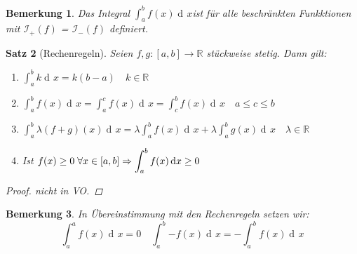 \documentclass[a4paper,titlepage,oneside]{article}
\def\R{\ensuremath{\mathbb{R}} }
\newcommand{\der}{\operatorname{d\!}{}}
\def\sp{\hspace{0,1cm}}
\newcommand{\integral}[4][x]{\ensuremath{\int_{#2}^{#3}{#4\der #1}}}
\newcommand{\intAB}[2][x]{\integral[#1]{a}{b}{#2}}
\newcommand{\OI}[1]{\ensuremath{\mathcal{I}_+\left(#1\right)}}
\newcommand{\UI}[1]{\ensuremath{\mathcal{I}_-\left(#1\right)}}
\theoremstyle{thmstyle}
\newtheorem{satz}{Satz}[section]
\newtheorem{bem}[satz]{Bemerkung}
\theoremstyle{subthmstyle}
\begin{document}
\begin{bem}
Das Integral $\displaystyle\intAB{f(x)} $ist für alle beschränkten Funkktionen mit \OI{f} = \UI{f} definiert.
\end{bem}

\begin{satz}[Rechenregeln]
Seien $f,g : [a,b] \to \R$ stückweise stetig. Dann gilt:
\begin{enumerate}
\item $\displaystyle\intAB{k} = k (b-a) \quad k \in \R$
\item $\displaystyle\intAB{f(x)} = \integral{a}{c}{f(x)} = \integral{c}{b}{f(x)} \quad a \le c \le b$
\item $\displaystyle\intAB{\lambda(f+g)(x)} = \lambda \intAB{f(x)} + \lambda \intAB{g(x)} \quad \lambda \in \R$
\item Ist $\displaystyle f(x) \ge 0 \sp \forall x \in [a,b] \Rightarrow \intAB{f(x)} \ge 0$
\end{enumerate}
\begin{proof}
nicht in VO. %
\end{proof}
\end{satz}

\begin{bem}
In Übereinstimmung mit den Rechenregeln setzen wir: \[\integral{a}{a}{f(x)} = 0 \quad \intAB{-f(x)} = -\intAB{f(x)}\]
\end{bem}
\end{document}
